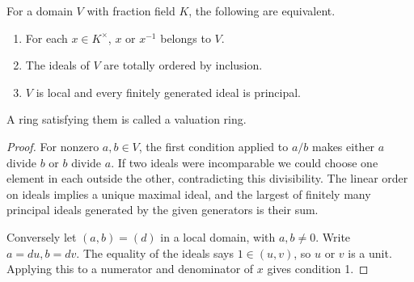 \begin{proposition}\label{res:W01}
For a domain \(V\) with fraction field \(K\), the following are equivalent.
\begin{enumerate}
\item For each \(x\in K^\times\), \(x\) or \(x^{-1}\) belongs to \(V\).
\item The ideals of \(V\) are totally ordered by inclusion.
\item \(V\) is local and every finitely generated ideal is principal.
\end{enumerate}
A ring satisfying them is called a valuation ring.
\end{proposition}
\begin{proof}
For nonzero \(a,b\in V\), the first condition applied to \(a/b\) makes either \(a\) divide \(b\) or \(b\) divide \(a\). If two ideals were incomparable we could choose one element in each outside the other, contradicting this divisibility. The linear order on ideals implies a unique maximal ideal, and the largest of finitely many principal ideals generated by the given generators is their sum.

Conversely let \((a,b)=(d)\) in a local domain, with \(a,b\ne0\). Write \(a=du,b=dv\). The equality of the ideals says \(1\in(u,v)\), so \(u\) or \(v\) is a unit. Applying this to a numerator and denominator of \(x\) gives condition 1.
\end{proof}

